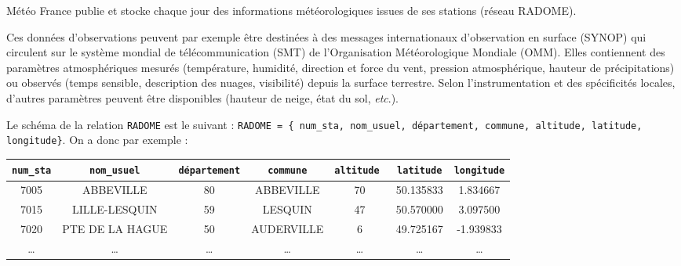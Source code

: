 \documentclass[10pt,fleqn]{article} %
\begin{document}

\vspace{2cm}
\pagestyle{fancy}
\thispagestyle{plain}

Météo France publie et stocke chaque jour des informations météorologiques issues de ses stations (réseau RADOME).

Ces données d'observations peuvent par exemple être destinées à des messages internationaux d’observation en surface (SYNOP) qui circulent sur le système mondial de télécommunication (SMT) de l’Organisation Météorologique Mondiale (OMM). Elles contiennent des paramètres atmosphériques mesurés (température, humidité, direction et force du vent, pression atmosphérique, hauteur de précipitations) ou observés (temps sensible, description des nuages, visibilité) depuis la surface terrestre. Selon l’instrumentation et des spécificités locales, d'autres paramètres peuvent être disponibles (hauteur de neige, état du sol, \textit{etc}.).

Le schéma de la relation \texttt{RADOME} est le suivant : 
\texttt{RADOME = \{ num\_sta, nom\_usuel, département, commune, altitude, latitude, longitude\}}. On a donc par exemple :
\begin{center}
\begin{tabular}{ccccccc}
\hline
\texttt{num\_sta} & \texttt{nom\_usuel} & \texttt{département} & \texttt{commune} & \texttt{altitude	} & \texttt{latitude} & \texttt{longitude} \\
\hline\hline
7005&	ABBEVILLE&	80&	ABBEVILLE&	70&	50.135833&	1.834667 \\
7015&	LILLE-LESQUIN&	59&	LESQUIN&	47&	50.570000&	3.097500\\
7020&	PTE DE LA HAGUE&	50&	AUDERVILLE	&6&	49.725167&	-1.939833\\
…&	…&	…&	…&	…&	…&	… \\
\hline
\end{tabular}
\end{center}
\end{document}

